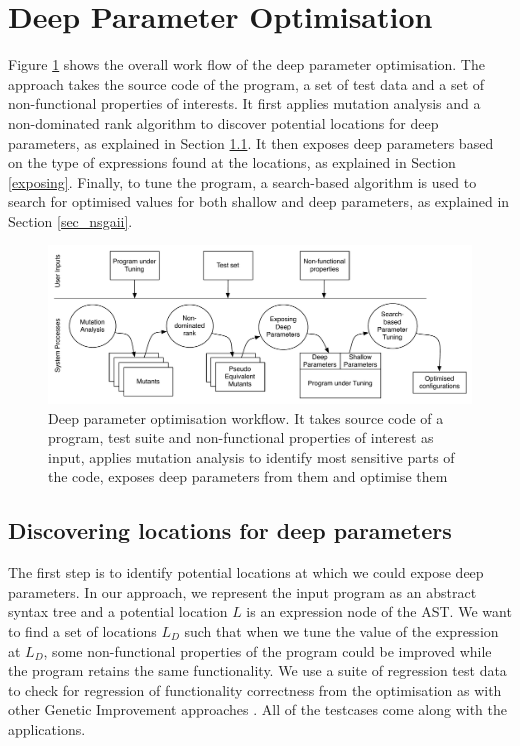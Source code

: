 \section{Deep Parameter Optimisation}
\label{sec_deep_parameter_optimisation}

Figure \ref{system} shows the overall work flow of the deep parameter optimisation. The approach takes the source code of the program, a set of test data and a set of non-functional properties of interests. 
It first applies mutation analysis and a non-dominated rank algorithm to discover potential locations for deep parameters, as explained in Section \ref{discovering}. It then exposes deep parameters based on the type of expressions found at the locations, as explained in Section \ref{exposing}. Finally, to tune the program, a search-based algorithm is used to search for optimised values for both shallow and deep parameters, as explained in Section \ref{sec_nsgaii}.

\begin{figure}[htbp]
\centering
\includegraphics[width=6.2in]{pics/new_system}
\caption{Deep parameter optimisation workflow. It takes source code of a program, test suite and non-functional properties of interest as input, applies mutation analysis to identify most sensitive parts of the code, exposes deep parameters from them and optimise them}\label{system}
\end{figure}

\subsection{Discovering locations for deep parameters}
\label{discovering}
The first step is to identify potential locations at which we could expose deep parameters. 
In our approach, we represent the input program as an abstract syntax tree and a potential location $L$ is an expression node of the AST. 
We want to find a set of locations $L_D$ such that when we tune the value of the expression at $L_D$, some non-functional properties of the program could be improved while the program retains the same functionality. 
We use a suite of regression test data to check for regression of functionality correctness from the optimisation as with other Genetic Improvement approaches \cite{justyna2013, Langdon:2014:IMI:2576768.2598244}. All of the testcases come along with the applications.

